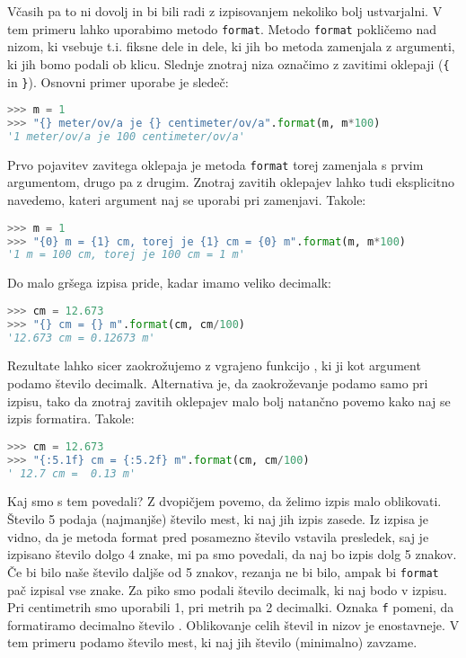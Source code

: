 Včasih pa to ni dovolj in bi bili radi z izpisovanjem nekoliko bolj ustvarjalni. V tem primeru lahko uporabimo metodo \texttt{format}. Metodo \texttt{format} pokličemo nad nizom, ki vsebuje t.i. fiksne dele in dele, ki jih bo metoda zamenjala z argumenti, ki jih bomo podali ob klicu. Slednje znotraj niza označimo z zavitimi oklepaji (\texttt{\{} in \texttt{\}}). Osnovni primer uporabe je sledeč:
\begin{lstlisting}[language=Python]
>>> m = 1
>>> "{} meter/ov/a je {} centimeter/ov/a".format(m, m*100)
'1 meter/ov/a je 100 centimeter/ov/a'
\end{lstlisting}
Prvo pojavitev zavitega oklepaja je metoda \texttt{format} torej zamenjala s prvim argumentom, drugo pa z drugim. Znotraj zavitih oklepajev lahko tudi eksplicitno navedemo, kateri argument naj se uporabi pri zamenjavi. Takole:
\begin{lstlisting}[language=Python]
>>> m = 1
>>> "{0} m = {1} cm, torej je {1} cm = {0} m".format(m, m*100)
'1 m = 100 cm, torej je 100 cm = 1 m'
\end{lstlisting}
Do malo gršega izpisa pride, kadar imamo veliko decimalk:
\begin{lstlisting}[language=Python]
>>> cm = 12.673
>>> "{} cm = {} m".format(cm, cm/100)
'12.673 cm = 0.12673 m'
\end{lstlisting}
Rezultate lahko sicer zaokrožujemo z vgrajeno funkcijo , ki ji kot argument podamo število decimalk. Alternativa je, da zaokroževanje podamo samo pri izpisu, tako da znotraj zavitih oklepajev malo bolj natančno povemo kako naj se izpis formatira. Takole:
\begin{lstlisting}[language=Python]
>>> cm = 12.673
>>> "{:5.1f} cm = {:5.2f} m".format(cm, cm/100)
' 12.7 cm =  0.13 m'
\end{lstlisting}
Kaj smo s tem povedali? Z dvopičjem povemo, da želimo izpis malo oblikovati. Število 5 podaja (najmanjše) število mest, ki naj jih izpis zasede. Iz izpisa je vidno, da je metoda format pred posamezno število vstavila presledek, saj je izpisano število dolgo 4 znake, mi pa smo povedali, da naj bo izpis dolg 5 znakov. Če bi bilo naše število daljše od 5 znakov, rezanja ne bi bilo, ampak bi \texttt{format} pač izpisal vse znake. Za piko smo podali število decimalk, ki naj bodo v izpisu. Pri centimetrih smo uporabili 1, pri metrih pa 2 decimalki. Oznaka \texttt{f} pomeni, da formatiramo decimalno število . Oblikovanje celih števil in nizov je enostavneje. V tem primeru podamo število mest, ki naj jih število (minimalno) zavzame. 
